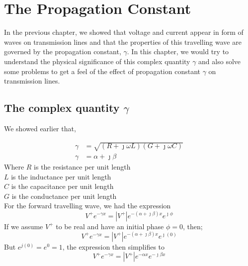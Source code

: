 \chapter{The Propagation Constant}
In the previous chapter, we showed that voltage and current appear in form of waves on transmission lines and that the properties of this travelling wave are governed by the propagation constant, $\gamma$. In this chapter, we would try to understand the physical significance of this complex quantity $\gamma$ and also solve some problems to get a feel of the effect of propagation constant $\gamma$ on transmission lines.

\section{The complex quantity $\gamma$}We showed earlier that,

\begin{align*}
\gamma &= \sqrt{(R + \jmath\omega L)(G + \jmath\omega C)} \\
\gamma & = \alpha + \jmath\beta
\end{align*}
Where $R$ is the resistance per unit length\\

\hspace{13pt}$L$ is the inductance per unit length\\
  
\hspace{13pt}$C$ is the capacitance per unit length\\
  
\hspace{13pt}$G$ is the conductance per unit length\\ 
For the forward travelling wave, we had the expression
\begin{equation}
V^+e^{-\gamma x} =\left|  V^+\right| e^{-(\alpha + \jmath\beta)x}e^{\jmath\phi}
\end{equation}
If we assume $V^+$ to be real and have an initial phase $\phi = 0$, then;
\begin{equation*}
V^+e^{-\gamma x} = \left| V^+\right| e^{-(\alpha + \jmath\beta)x}e^{\jmath (0)}
\end{equation*}
But $ e^{j(0)} = e^0 = 1 $, the expression then simplifies to
\begin{equation}
V^+e^{-\gamma x} = \left| V^+\right| e^{-\alpha x}e^{-\jmath\beta x}
\label{eqn3.2}
\end{equation}
